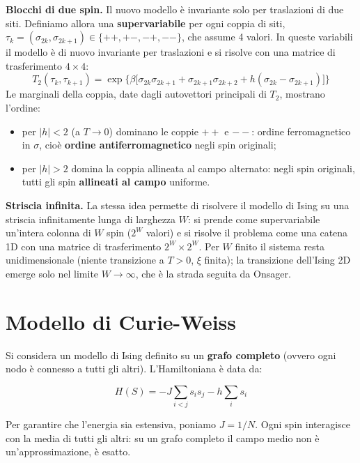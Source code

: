 \noindent\textbf{Blocchi di due spin.} Il nuovo modello è invariante solo per traslazioni di due siti. Definiamo allora una \textbf{supervariabile} per ogni coppia di siti, $\tau_k = (\sigma_{2k}, \sigma_{2k+1}) \in \{++, +-, -+, --\}$, che assume 4 valori. In queste variabili il modello è di nuovo invariante per traslazioni e si risolve con una matrice di trasferimento $4 \times 4$:
\begin{equation}
    T_2(\tau_k, \tau_{k+1}) = \exp\Big\{ \beta \big[ \sigma_{2k}\sigma_{2k+1} + \sigma_{2k+1}\sigma_{2k+2} + h(\sigma_{2k} - \sigma_{2k+1}) \big] \Big\}
\end{equation}
Le marginali della coppia, date dagli autovettori principali di $T_2$, mostrano l'ordine:
\begin{itemize}
    \item per $|h| < 2$ (a $T \to 0$) dominano le coppie $++$ e $--$: ordine ferromagnetico in $\sigma$, cioè \textbf{ordine antiferromagnetico} negli spin originali;
    \item per $|h| > 2$ domina la coppia allineata al campo alternato: negli spin originali, tutti gli spin \textbf{allineati al campo} uniforme.
\end{itemize}

\noindent\textbf{Striscia infinita.} La stessa idea permette di risolvere il modello di Ising su una striscia infinitamente lunga di larghezza $W$: si prende come supervariabile un'intera colonna di $W$ spin ($2^W$ valori) e si risolve il problema come una catena 1D con una matrice di trasferimento $2^W \times 2^W$. Per $W$ finito il sistema resta unidimensionale (niente transizione a $T>0$, $\xi$ finita); la transizione dell'Ising 2D emerge solo nel limite $W \to \infty$, che è la strada seguita da Onsager.



\newpage
\section{Modello di Curie-Weiss}

Si considera un modello di Ising definito su un \textbf{grafo completo} (ovvero ogni nodo è connesso a tutti gli altri). L'Hamiltoniana è data da:

\begin{equation}
H(S) = -J \sum_{i<j} s_i s_j - h \sum_i s_i 
\end{equation}


\noindent Per garantire che l'energia sia estensiva, poniamo $J = 1/N$. Ogni spin interagisce con la media di tutti gli altri: su un grafo completo il campo medio non è un'approssimazione, è esatto.


